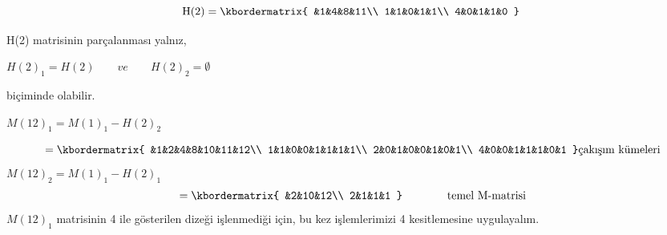 \documentclass[11pt]{amsbook}
\begin{document}
\renewcommand{\kbldelim}{[}%
\renewcommand{\kbrdelim}{]}%
\[
\text{H(2)}=\kbordermatrix{
&1&4&8&11\\
1&1&0&1&1\\
4&0&1&1&0
}
\]

H(2) matrisinin parçalanması yalnız,

\begin{center}
$H(2)_{1} = H(2) \qquad ve \qquad H(2)_{2} = \emptyset $
\end{center}

biçiminde olabilir.

$M(12)_{1} = M(1)_{1} - H(2)_{2}$

\renewcommand{\kbldelim}{[}%
\renewcommand{\kbrdelim}{]}%
\[
\text{}=\kbordermatrix{
&1&2&4&8&10&11&12\\
1&1&0&0&1&1&1&1\\
2&0&1&0&0&1&0&1\\
4&0&0&1&1&1&0&1
} 
\text{çakışım kümeleri}
\] 
$M(12)_2=M(1)_1-H(2)_1$
\renewcommand{\kbldelim}{[}%
\renewcommand{\kbrdelim}{]}%
\[
\text{}=\kbordermatrix{
&2&10&12\\
2&1&1&1
} 
\text{\qquad \qquad temel M-matrisi}
\] 
$M(12)_1$ matrisinin 4 ile gösterilen dizeği işlenmediği için, bu kez işlemlerimizi 4 kesitlemesine uygulayalım.             
\end{document}
